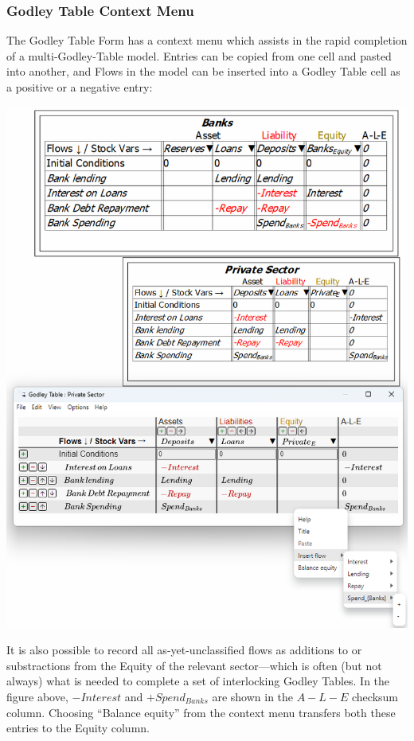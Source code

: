 \subsubsection{Godley Table Context Menu}

The Godley Table Form has a context menu which assists in the rapid
completion of a multi-Godley-Table model. Entries can be copied from
one cell and pasted into another, and Flows in the model can be inserted
into a Godley Table cell as a positive or a negative entry:

\noindent\includegraphics[width=\textwidth]{images/GodleyTableContextMenu}

It is also possible to record all as-yet-unclassified flows as additions
to or substractions from the Equity of the relevant sector---which
is often (but not always) what is needed to complete a set of interlocking
Godley Tables. In the figure above, $-Interest$ and $+Spend_{Banks}$
are shown in the $A-L-E$ checksum column. Choosing ``Balance equity''
from the context menu transfers both these entries to the Equity column.

